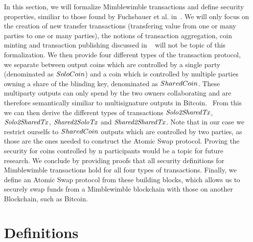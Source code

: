 In this section, we will formalize Mimblewimble transactions and define security properties, similiar to those found by Fuchsbauer et al. in~\cite{fuchsbauer2019aggregate}. We will only focus on the creation of new transfer transactions
(transfering value from one or many parties to one or many parties), the notions of transaction aggregation, coin minting and transaction publishing discussed in ~\cite{fuchsbauer2019aggregate} will not be topic of this formalization.
We then provide four different types of the transaction protocol, we separate between output coins which are controlled by a single party (denominated as $SoloCoin$) and a coin which is controlled by multiple parties owning a share of the blinding key, denominated as $SharedCoin$.
These multiparty outputs can only spend by the two owners collaborating and are therefore semantically similiar to multisignature outputs in Bitcoin.~\cite{bistarelli2018analysis}
From this we can then derive the different types of transactions $\mathit{Solo2SharedTx}$, $\mathit{Solo2SharedTx}$, $\mathit{Shared2SoloTx}$ and $\mathit{Shared2SharedTx}$.
Note that in our case we restrict ourselfs to $SharedCoin$ outputs which are controlled by two parties, as those are the ones needed to construct the Atomic Swap protocol.
Proving the security for coins controlled by n participants would be a topic for future research.
We conclude by providing proofs that all security definitions for Mimblewimble transactions hold for all four types of transactions.
Finally, we define an Atomic Swap protocol from these building blocks, which allows us to securely swap funds from a Mimblewimble blockchain with those on another Blockchain, such as Bitcoin.

\section{Definitions}\label{sec:atomic-def}

